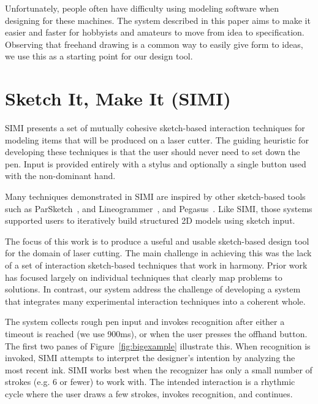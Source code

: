 \documentclass{chi-ext}
\begin{document}
Unfortunately, people often have difficulty using modeling software
when designing for these machines. The system described in this paper
aims to make it easier and faster for hobbyists and amateurs to move
from idea to specification. Observing that freehand drawing is a
common way to easily give form to ideas, we use this as a starting
point for our design tool.

\section{Sketch It, Make It (SIMI)}

SIMI presents a set of mutually cohesive sketch-based interaction
techniques for modeling items that will be produced on a laser
cutter. The guiding heuristic for developing these techniques is that
the user should never need to set down the pen. Input is provided
entirely with a stylus and optionally a single button used with the
non-dominant hand.

Many techniques demonstrated in SIMI are inspired by other
sketch-based tools such as ParSketch~\cite{naya-parsketch}, and
Lineogrammer~\cite{zeleznik-lineogrammer}, and
Pegasus~\cite{igarashi-pegasus}. Like SIMI, those systems supported
users to iteratively build structured 2D models using sketch input.

The focus of this work is to produce a useful and usable sketch-based
design tool for the domain of laser cutting. The main challenge in
achieving this was the lack of a set of interaction sketch-based
techniques that work in harmony. Prior work has focused largely on
individual techniques that clearly map problems to solutions. In
contrast, our system address the challenge of developing a system that
integrates many experimental interaction techniques into a coherent
whole.

The system collects rough pen input and invokes recognition after
either a timeout is reached (we use 900ms), or when the user presses
the offhand button. The first two panes of Figure~\ref{fig:bigexample}
illustrate this. When recognition is invoked, SIMI attempts to
interpret the designer's intention by analyzing the most recent
ink. SIMI works best when the recognizer has only a small number of
strokes (e.g. 6 or fewer) to work with. The intended interaction is a
rhythmic cycle where the user draws a few strokes, invokes recognition,
and continues.
\end{document}
